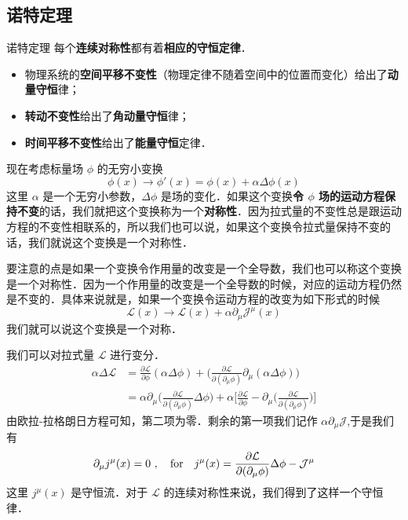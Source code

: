 \subsection{诺特定理}
\begin{theorem}{诺特定理}
每个\textbf{连续对称性}都有着\textbf{相应的守恒定律}．
\begin{itemize}
\item 物理系统的\textbf{空间平移不变性}（物理定律不随着空间中的位置而变化）给出了\textbf{动量守恒}律；
\item \textbf{转动不变性}给出了\textbf{角动量守恒}律；
\item \textbf{时间平移不变性}给出了\textbf{能量守恒}定律．
\end{itemize}
\end{theorem}
现在考虑标量场 $\phi$ 的无穷小变换
\begin{equation}
\phi(x) \rightarrow \phi'(x) = \phi(x) +\alpha \Delta \phi (x)
\end{equation}
这里 $\alpha$ 是一个无穷小参数，$\Delta \phi$ 是场的变化．如果这个变换\textbf{令 $\phi$ 场的运动方程保持不变}的话，我们就把这个变换称为一个\textbf{对称性}．因为拉式量的不变性总是跟运动方程的不变性相联系的，所以我们也可以说，如果这个变换令拉式量保持不变的话，我们就说这个变换是一个对称性．

要注意的点是如果一个变换令作用量的改变是一个全导数，我们也可以称这个变换是一个对称性．因为一个作用量的改变是一个全导数的时候，对应的运动方程仍然是不变的．具体来说就是，如果一个变换令运动方程的改变为如下形式的时候
\begin{equation}
\mathcal L(x) \rightarrow \mathcal L (x) +\alpha \partial_\mu \mathcal J^\mu (x)
\end{equation}
我们就可以说这个变换是一个对称．

我们可以对拉式量 $\mathcal L$ 进行变分．
\begin{align}\nonumber
\alpha \Delta \mathcal L & = \frac{\partial \mathcal L}{\partial \phi} (\alpha \Delta \phi) + \bigg( \frac{\partial \mathcal L}{\partial(\partial_\mu \phi)} \partial_\mu(\alpha \Delta \phi)\bigg) \\
& = \alpha \partial_\mu \bigg( \frac{\partial \mathcal L}{\partial (\partial_\mu\phi)} \Delta \phi \bigg) + \alpha \bigg[ \frac{\partial \mathcal L}{\partial \phi} - \partial_\mu \bigg( \frac{\partial \mathcal L}{\partial(\partial_\mu \phi)} \bigg) \bigg]
\end{align}
由欧拉-拉格朗日方程可知，第二项为零．剩余的第一项我们记作 $\alpha \partial_\mu \mathcal J$,于是我们有
\begin{equation}
\partial_\mu j^\mu(x) = 0~, \quad {\rm for}\quad j^\mu(x) = \frac{\partial \mathcal L}{\partial(\partial_\mu \phi)} \Delta \phi - \mathcal J^\mu
\end{equation}
这里 $j^\mu(x)$ 是守恒流．对于 $\mathcal L$ 的连续对称性来说，我们得到了这样一个守恒律．

